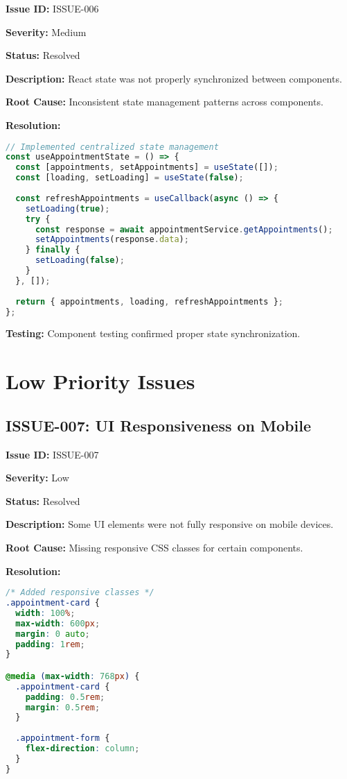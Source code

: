 \documentclass[12pt,a4paper]{article}
\begin{document}
\textbf{Issue ID:} ISSUE-006

\textbf{Severity:} Medium

\textbf{Status:} Resolved

\textbf{Description:} React state was not properly synchronized between components.

\textbf{Root Cause:} Inconsistent state management patterns across components.

\textbf{Resolution:}
\begin{lstlisting}[language=JavaScript, caption=State Management Fix]
// Implemented centralized state management
const useAppointmentState = () => {
  const [appointments, setAppointments] = useState([]);
  const [loading, setLoading] = useState(false);
  
  const refreshAppointments = useCallback(async () => {
    setLoading(true);
    try {
      const response = await appointmentService.getAppointments();
      setAppointments(response.data);
    } finally {
      setLoading(false);
    }
  }, []);
  
  return { appointments, loading, refreshAppointments };
};
\end{lstlisting}

\textbf{Testing:} Component testing confirmed proper state synchronization.

\section{Low Priority Issues}

\subsection{ISSUE-007: UI Responsiveness on Mobile}

\textbf{Issue ID:} ISSUE-007

\textbf{Severity:} Low

\textbf{Status:} Resolved

\textbf{Description:} Some UI elements were not fully responsive on mobile devices.

\textbf{Root Cause:} Missing responsive CSS classes for certain components.

\textbf{Resolution:}
\begin{lstlisting}[language=CSS, caption=Responsive Design Fix]
/* Added responsive classes */
.appointment-card {
  width: 100%;
  max-width: 600px;
  margin: 0 auto;
  padding: 1rem;
}

@media (max-width: 768px) {
  .appointment-card {
    padding: 0.5rem;
    margin: 0.5rem;
  }
  
  .appointment-form {
    flex-direction: column;
  }
}
\end{lstlisting}
\end{document}
